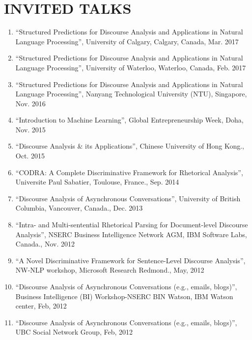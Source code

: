 \documentclass[paper=letter,fontsize=11pt]{scrartcl} %
\newcommand{\NewPart}[2]{\section*{\uppercase{#1} #2}}
\newcommand{\TalkEntry}[4]{
		\noindent #1, #2, #3 #4}
\begin{document}
\NewPart{Invited Talks}{}
\begin{enumerate}

\item\TalkEntry{``Structured Predictions for Discourse Analysis and Applications in Natural Language Processing'', University of Calgary} {Calgary, Canada}{Mar. 2017}{}

\item\TalkEntry{``Structured Predictions for Discourse Analysis and Applications in Natural Language Processing'', University of Waterloo} {Waterloo, Canada}{Feb. 2017}{}

\item\TalkEntry{``Structured Predictions for Discourse Analysis and Applications in Natural Language Processing'', Nanyang Technological University (NTU)} {Singapore}{Nov. 2016}{}

\item\TalkEntry{``Introduction to Machine Learning'', Global Entrepreneurship Week} {Doha}{Nov. 2015}{}
\item\TalkEntry{``Discourse Analysis \& its Applications''} {Chinese University of Hong Kong.}{Oct. 2015}{}
\item\TalkEntry{``CODRA: A Complete Discriminative Framework for Rhetorical Analysis''} {Universite Paul Sabatier, Toulouse, France.}{Sep. 2014}{}

\item\TalkEntry{``Discourse Analysis of Asynchronous Conversations''} {University of British Columbia, Vancouver, Canada.}{Dec. 2013}{}

\item\TalkEntry{``Intra- and Multi-sentential Rhetorical Parsing for Document-level Discourse Analysis''} {NSERC Business Intelligence Network AGM, IBM Software Labs, Canada.}{Nov. 2012}{}

\item\TalkEntry{``A Novel Discriminative Framework for Sentence-Level Discourse Analysis''} {NW-NLP workshop, Microsoft Research Redmond.}{May, 2012}{}

\item\TalkEntry{``Discourse Analysis of Asynchronous Conversations (e.g., emails, blogs)''} {Business Intelligence (BI) Workshop-NSERC BIN Watson, IBM Watson center}{Feb, 2012}{}

\item\TalkEntry{``Discourse Analysis of Asynchronous Conversations (e.g., emails, blogs)''} {UBC Social Network Group}{Feb, 2012}{}


\end{enumerate}
\end{document}
